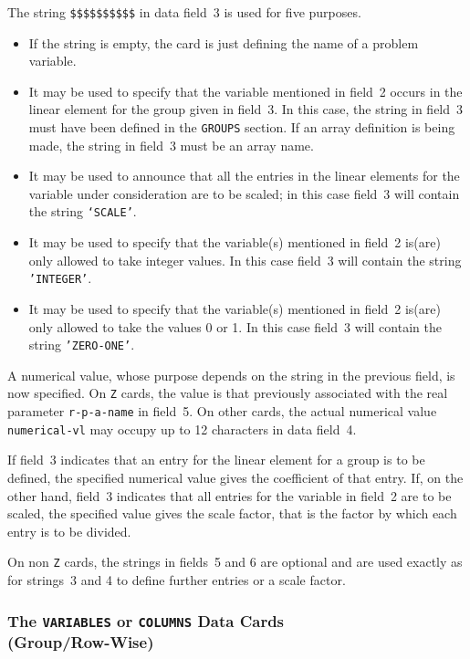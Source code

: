 \documentclass[a4paper]{article}
\begin{document}
The  string {\tt  \$\$\$\$\$\$\$\$\$\$} in  data field~3 is   used for
five purposes.
\begin{itemize}
\item
If the string  is empty, the  card
is   just  defining the name
of  a problem variable.
\item
It may be  used  to specify  that  the  variable mentioned  in field~2
occurs in the linear element
for the group given  in field~3. In this
case, the string in field~3 must have been defined in the {\tt GROUPS}
section.  If an array definition is being made, the string  in field~3
must be an array name.
\item
It may be used to announce that all the entries in the linear elements
for the  variable under consideration  are to be  scaled;
in this case field~3 will contain the string {\tt `SCALE'}.
\item
It may be  used  to specify  that  the  variable(s) mentioned  in field~2
is(are) only allowed to take integer values. In this case field~3 will
contain the string {\tt 'INTEGER'}.
\item
It may be  used  to specify  that  the  variable(s) mentioned  in field~2
is(are) only allowed to take the values 0 or 1. In this case field~3 will
contain the string {\tt 'ZERO-ONE'}.
\end{itemize}

A numerical value, whose purpose depends on the string in the previous
field,   is  now specified.   On  {\tt Z}   cards,
the value  is that
previously associated with  the  real parameter {\tt r-p-a-name} in
field~5.  On     other cards, the   actual   numerical   value    {\tt
numerical-vl} may occupy up to 12 characters in data field~4.

If field~3 indicates that an entry for the linear  element
for a group
is to be defined, the specified numerical  value gives the coefficient
of that entry.   If, on the other  hand, field~3  indicates   that all
entries for the variable  in  field~2 are to  be scaled, the specified
value gives the scale factor,
that is the  factor by  which each entry is to be divided.

On non {\tt Z} cards,
the strings in fields~5  and  6 are optional and
are used exactly as for strings~3 and 4 to define further entries or a
scale factor.

\subsubsection[The {\tt VARIABLES} or {\tt COLUMNS} Data Cards
 (Group/Row-Wise)]{\label{S2.2.8}The {\tt VARIABLES} or {\tt COLUMNS} Data Cards
 \protect\\
(Group/Row-Wise)}
\end{document}
